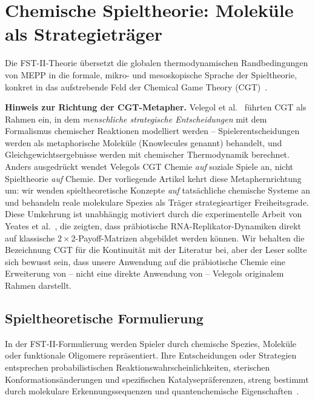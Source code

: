 \documentclass[12pt,a4paper]{article}
\theoremstyle{remark}
\begin{document}
\section{Chemische Spieltheorie: Moleküle als Strategieträger}
\label{sec:cgt}

Die FST-II-Theorie übersetzt die globalen thermodynamischen Randbedingungen von MEPP in die formale, mikro- und mesoskopische Sprache der Spieltheorie, konkret in das aufstrebende Feld der Chemical Game Theory (CGT)~\citep{CGT2018,CGTMacmillan}.

\textbf{Hinweis zur Richtung der CGT-Metapher.} Velegol et al.~\citep{CGT2018} führten CGT als Rahmen ein, in dem \emph{menschliche strategische Entscheidungen} mit dem Formalismus chemischer Reaktionen modelliert werden -- Spielerentscheidungen werden als metaphorische \glqq Moleküle\grqq{} (\glqq Knowlecules\grqq{} genannt) behandelt, und Gleichgewichtsergebnisse werden mit chemischer Thermodynamik berechnet. Anders ausgedrückt wendet Velegols CGT Chemie \emph{auf} soziale Spiele an, nicht Spieltheorie \emph{auf} Chemie. Der vorliegende Artikel kehrt diese Metaphernrichtung um: wir wenden spieltheoretische Konzepte \emph{auf} tatsächliche chemische Systeme an und behandeln reale molekulare Spezies als Träger strategieartiger Freiheitsgrade. Diese Umkehrung ist unabhängig motiviert durch die experimentelle Arbeit von Yeates et al.~\citep{AzoarcusPNAS}, die zeigten, dass präbiotische RNA-Replikator-Dynamiken direkt auf klassische $2\times 2$-Payoff-Matrizen abgebildet werden können. Wir behalten die Bezeichnung \glqq CGT\grqq{} für die Kontinuität mit der Literatur bei, aber der Leser sollte sich bewusst sein, dass unsere Anwendung auf die präbiotische Chemie eine Erweiterung von -- nicht eine direkte Anwendung von -- Velegols originalem Rahmen darstellt.

\subsection{Spieltheoretische Formulierung}

In der FST-II-Formulierung werden Spieler durch chemische Spezies, Moleküle oder funktionale Oligomere repräsentiert. Ihre \glqq Entscheidungen\grqq{} oder \glqq Strategien\grqq{} entsprechen probabilistischen Reaktionswahrscheinlichkeiten, sterischen Konformationsänderungen und spezifischen Katalysepräferenzen, streng bestimmt durch molekulare Erkennungssequenzen und quantenchemische Eigenschaften~\citep{ThermodynamicSelection}.
\end{document}

